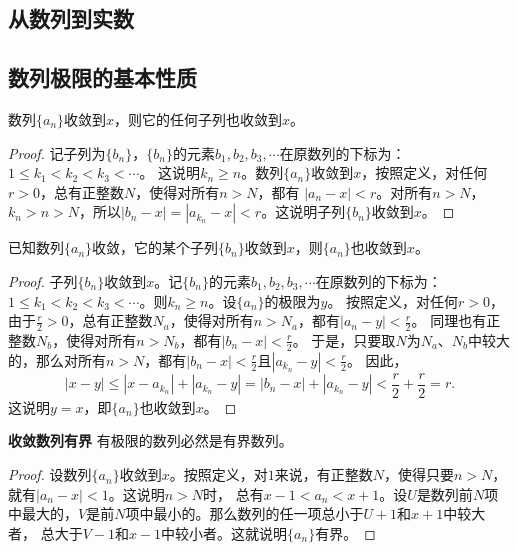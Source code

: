 \documentclass[12pt,UTF8]{ctexbook}
\begin{document}
\begin{appendix}

\chapter{从数列到实数}
\section{数列极限的基本性质}

\begin{tm}\label{tm:a-0-10}
    数列$\{a_n\}$收敛到$x$，则它的任何子列也收敛到$x$。
\end{tm}
\begin{proof}
    记子列为$\{b_n\}$，$\{b_n\}$的元素$b_1,b_2,b_3,\cdots$在原数列的下标为：$1\leqslant k_1<k_2<k_3<\cdots$。
    这说明$k_n \geqslant n$。数列$\{a_n\}$收敛到$x$，按照定义，对任何$r>0$，总有正整数$N$，使得对所有$n>N$，都有
    $ |a_n - x| < r$。对所有$n>N$，$k_n>n>N$，所以$|b_n - x| = |a_{k_n} - x| < r$。这说明子列$\{b_n\}$收敛到$x$。
\end{proof}

\begin{tm}\label{tm:a-0-20}
    已知数列$\{a_n\}$收敛，它的某个子列$\{b_n\}$收敛到$x$，则$\{a_n\}$也收敛到$x$。
 \end{tm}
\begin{proof}
    子列$\{b_n\}$收敛到$x$。记$\{b_n\}$的元素$b_1,b_2,b_3,\cdots$在原数列的下标为：
    $1\leqslant k_1<k_2<k_3<\cdots$。则$k_n \geqslant n$。设$\{a_n\}$的极限为$y$。
    按照定义，对任何$r>0$，由于$\frac{r}{2} > 0$，总有正整数$N_a$，使得对所有$n>N_a$，都有$ |a_n - y| < \frac{r}{2}$。
    同理也有正整数$N_b$，使得对所有$n>N_b$，都有$ |b_n - x| < \frac{r}{2}$。
    于是，只要取$N$为$N_a$、$N_b$中较大的，那么对所有$n>N$，都有$|b_n - x| < \frac{r}{2}$且$ |a_{k_n} - y| < \frac{r}{2}$。
    因此，
    $$|x - y| \leqslant |x - a_{k_n}| + |a_{k_n} - y| = |b_n - x| + |a_{k_n} - y| < \frac{r}{2} + \frac{r}{2} = r. $$
    这说明$y = x$，即$\{a_n\}$也收敛到$x$。
\end{proof}

\begin{tm}{\textbf{收敛数列有界}}\label{tm:a-0-30}
    有极限的数列必然是有界数列。
\end{tm}
\begin{proof}
    设数列$\{a_n\}$收敛到$x$。按照定义，对$1$来说，有正整数$N$，使得只要$n>N$，就有$|a_n - x| < 1$。这说明$n>N$时，
    总有$x - 1 < a_n < x + 1$。设$U$是数列前$N$项中最大的，$V$是前$N$项中最小的。那么数列的任一项总小于$U+1$和$x+1$中较大者，
    总大于$V-1$和$x-1$中较小者。这就说明$\{a_n\}$有界。
\end{proof}


\end{appendix}
\end{document}
